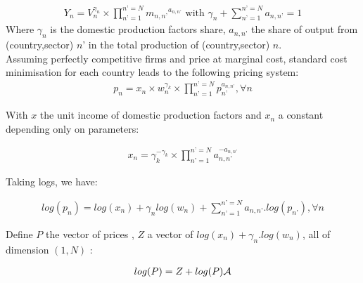 \documentclass[11pt,a4paper]{article}
\begin{document}
\begin{eqnarray*}
Y_n=V^{\gamma_n}_n \times \prod_{n’=1}^{n’=N} {m_{n,n’}}^{a_{n,n’}} \text{ with } \gamma_n +\sum_{n’=1}^{n’=N} {a_{n,n’}} =1
\end{eqnarray*}
Where $\gamma_n$ is the domestic production factors share, $a_{n,n’}$ the share of output from (country,sector) $n’$ in the total production of (country,sector) $n$. \\ 
Assuming perfectly competitive firms and price at marginal cost, standard cost minimisation for each country leads to the following pricing system:
\begin{eqnarray*}
	p_n=x_n \times w_n^{\gamma_k} \times \prod_{n’=1}^{n’=N}p_{n’}^{a_{n,n’}}, \forall n 
\end{eqnarray*}

With $x$ the unit income of domestic production factors and $x_n$ a constant depending only on parameters:

\begin{eqnarray*}
	x_n=\gamma_k^{-\gamma_k} \times \prod_{n’=1}^{n’=N}a_{n,n’}^{-a_{n,n’}}
\end{eqnarray*}

Taking logs, we have:

\begin{eqnarray*}
	log(p_n) = log(x_n) + \gamma_n log(w_n) + \sum_{n’=1}^{n’=N}a_{n,n’}.log(p_{n’}), \forall n
\end{eqnarray*}

Define $P$ the vector of prices , $Z$ a vector of $log(x_n)+\gamma_n.log(w_n)$, all of dimension $(1,N)$ : 

\begin{eqnarray}
	log(P)=Z + log(P){\cal A}
	\label{eq:priceequation} 
\end{eqnarray}
\end{document}
